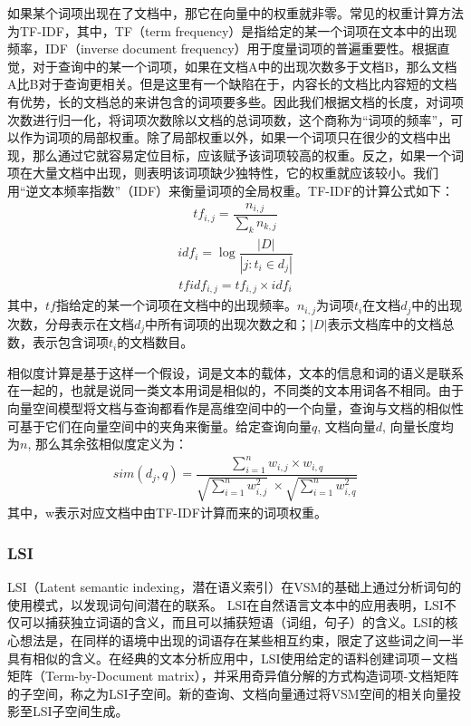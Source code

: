 如果某个词项出现在了文档中，那它在向量中的权重就非零。常见的权重计算方法为TF-IDF，其中，TF（term frequency）是指给定的某一个词项在文本中的出现频率，IDF（inverse document frequency）用于度量词项的普遍重要性。根据直觉，对于查询中的某一个词项，如果在文档A中的出现次数多于文档B，那么文档A比B对于查询更相关。但是这里有一个缺陷在于，内容长的文档比内容短的文档有优势，长的文档总的来讲包含的词项要多些。因此我们根据文档的长度，对词项次数进行归一化，将词项次数除以文档的总词项数，这个商称为“词项的频率”，可以作为词项的局部权重。除了局部权重以外，如果一个词项只在很少的文档中出现，那么通过它就容易定位目标，应该赋予该词项较高的权重。反之，如果一个词项在大量文档中出现，则表明该词项缺少独特性，它的权重就应该较小。我们用“逆文本频率指数”（IDF）来衡量词项的全局权重。TF-IDF的计算公式如下：
\begin{align}
    tf_{i,j}=\dfrac {n_{i,j}} {\sum _{k}n_{k,j}}
  \end{align}
  \begin{align}
    idf_{i}=\log \dfrac {\left| D\right| } {\left| j:t_{i}\in d_{j}\right| }
  \end{align}
   \begin{align}
    tfidf_{i,j}=tf_{i,j} \times idf_{i}
  \end{align}
其中，$tf$指给定的某一个词项在文档中的出现频率。$n_{i,j}$为词项$t_{i}$在文档$d_{j}$中的出现次数，分母表示在文档$d_{j}$中所有词项的出现次数之和；$\left| D\right|$表示文档库中的文档总数，表示包含词项$t_{i}$的文档数目。

相似度计算是基于这样一个假设，词是文本的载体，文本的信息和词的语义是联系在一起的，也就是说同一类文本用词是相似的，不同类的文本用词各不相同。由于向量空间模型将文档与查询都看作是高维空间中的一个向量，查询与文档的相似性可基于它们在向量空间中的夹角来衡量。给定查询向量$q$, 文档向量$d$, 向量长度均为$n$, 那么其余弦相似度定义为：
\begin{align}
    sim(d_{j},q)=\dfrac {\sum _{i=1}^{n}w_{i,j} \times w_{i,q}} {\sqrt {\sum _{i=1}^{n}w_{i,j}^{2}} \ \times \sqrt {\sum _{i=1}^{n}w_{i,q}^{2}}}
  \end{align}
其中，w表示对应文档中由TF-IDF计算而来的词项权重。

\subsubsection{LSI}
LSI（Latent semantic indexing，潜在语义索引）\cite{deerwester1990indexing,dumais1991improving}在VSM的基础上通过分析词句的使用模式，以发现词句间潜在的联系。
LSI在自然语言文本中的应用表明\cite{berry1992large,landauer1997solution}，LSI不仅可以捕获独立词语的含义，而且可以捕获短语（词组，句子）的含义。LSI的核心想法是，在同样的语境中出现的词语存在某些相互约束，限定了这些词之间一半具有相似的含义。在经典的文本分析应用中，LSI使用给定的语料创建词项－文档矩阵（Term-by-Document matrix），并采用奇异值分解\cite{salton1986introduction}的方式构造词项-文档矩阵的子空间，称之为LSI子空间。新的查询、文档向量通过将VSM空间的相关向量投影至LSI子空间生成。

